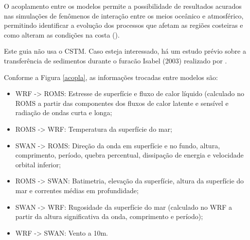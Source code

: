\noindent O acoplamento entre os modelos permite a possibilidade de resultados acurados nas simulações de fenômenos de interação entre os meios oceânico e atmosférico, permitindo identificar a evolução dos processos que afetam as regiões costeiras e como alteram as condições na costa (\cite{Pullen2018, Miller2018}).
\bigskip

\begin{tcolorbox}[enhanced,
  grow to left by   = 0cm,
  grow to right by  = 0cm,
  enlarge top by    = 0cm,
  enlarge bottom by = 0cm,
  tcbox raise base,
  boxrule           = 1.0pt,
  left              = 18mm,
  colframe          = red!50!black,coltext=red!25!black,colback=red!10!white,
  overlay           = {\begin{tcbclipinterior}\fill[red!75!blue!50!white] (frame.south west)
    rectangle node[text=white,font=\sffamily\bfseries\footnotesize,rotate=0] {ATENÇÃO} ([xshift=18mm]frame.north west);\end{tcbclipinterior}}]
Este guia não usa o CSTM. Caso esteja interessado, há um estudo prévio sobre a transferência de sedimentos durante o furacão Isabel (2003) realizado por \textcite{Warner2010}.
\end{tcolorbox}
\bigskip


\noindent Conforme a Figura \textcolor{bleu_cite}{\ref{acopla}}, as informações trocadas entre modelos são:
\bigskip

\begin{itemize}
\item WRF -> ROMS: Estresse de superfície e fluxo de calor líquido (calculado no ROMS a partir das componentes dos fluxos de calor latente e sensível e radiação de ondas curta e longa;
\item ROMS -> WRF: Temperatura da superfície do mar;
\item SWAN -> ROMS: Direção da onda em superfície e no fundo, altura, comprimento, período, quebra percentual, dissipação de energia e velocidade orbital inferior;
\item ROMS -> SWAN: Batimetria, elevação da superfície, altura da superfície do mar e correntes médias em profundidade;
\item SWAN -> WRF: Rugosidade da superfície do mar (calculado no WRF a partir da altura significativa da onda, comprimento e período);
\item WRF -> SWAN: Vento a 10m.
\end{itemize}
\bigskip

